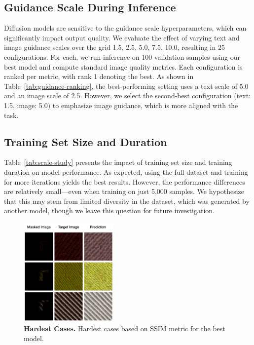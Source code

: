 \documentclass[11pt,twocolumn]{article}
\begin{document}
\subsection{Guidance Scale During Inference}
\vspace{-.8em}

Diffusion models are sensitive to the guidance scale hyperparameters, which can significantly impact output quality. 
We evaluate the effect of varying text and image guidance scales over the grid {1.5, 2.5, 5.0, 7.5, 10.0}, resulting 
in 25 configurations. For each, we run inference on 100 validation samples using our best model and compute 
standard image quality metrics. Each configuration is ranked per metric, with rank 1 denoting the best. 
As shown in Table~\ref{tab:guidance-ranking}, the best-performing setting uses a text scale of 5.0 and an image scale of 2.5. 
However, we select the second-best configuration (text: 1.5, image: 5.0) to emphasize image guidance, which is more aligned 
with the task.

\subsection{Training Set Size and Duration}

Table~\ref{tab:scale-study} presents the impact of training set size and training duration on model performance. 
As expected, using the full dataset and training for more iterations yields the best results. 
However, the performance differences are relatively small—even when training on just 5,000 samples. 
We hypothesize that this may stem from limited diversity in the dataset, which was generated by another model, 
though we leave this question for future investigation.

\begin{figure}[t]
  \centering
  \includegraphics[width=0.43\textwidth]{figures/failure_cases.png}
  \caption{\textbf{Hardest Cases.} Hardest cases based on SSIM metric for the best model.}
  \label{fig:hardest-cases}
\end{figure}
\end{document}
